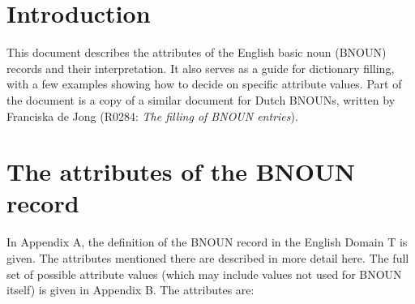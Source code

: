 

   \RosSupersedes{-}
   \MakeRosTitle
%
%

\section{Introduction}

This document describes the attributes of the English basic noun (BNOUN) 
records and their interpretation. 
It also serves as a guide for dictionary filling, with a few 
examples showing how to decide on specific attribute values.
Part of the document is a copy of a similar 
document for Dutch BNOUNs, written by Franciska de 
Jong (R0284: {\em The filling of BNOUN entries\/}).
 
\section{The attributes of the BNOUN record}
In Appendix A, the definition of the BNOUN record in the English Domain T is 
given. The attributes mentioned there are described in more detail here. The 
full set of possible attribute values (which may include values not used for 
BNOUN itself) is given in Appendix B. The attributes are:

